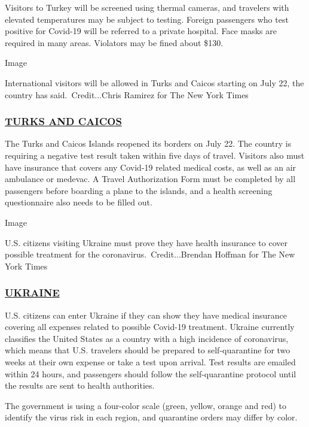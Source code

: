 Visitors to Turkey will be screened using thermal cameras, and travelers
with elevated temperatures may be subject to testing. Foreign passengers
who test positive for Covid-19 will be referred to a private hospital.
Face masks are required in many areas. Violators may be fined about
\$130.

Image

International visitors will be allowed in Turks and Caicos starting on
July 22, the country has said.~Credit...Chris Ramirez for The New York
Times

\hypertarget{turks-and-caicos}{%
\subsubsection{\texorpdfstring{\href{https://turksandcaicostourism.com/}{TURKS
AND CAICOS}}{TURKS AND CAICOS}}\label{turks-and-caicos}}

The Turks and Caicos Islands reopened its borders on July 22. The
country is requiring a negative test result taken within five days of
travel. Visitors also must have insurance that covers any Covid-19
related medical costs, as well as an air ambulance or medevac. A Travel
Authorization Form must be completed by all passengers before boarding a
plane to the islands, and a health screening questionnaire also needs to
be filled out.

Image

U.S. citizens visiting Ukraine must prove they have health insurance to
cover possible treatment for the coronavirus.~Credit...Brendan Hoffman
for The New York Times

\hypertarget{ukraine}{%
\subsubsection{\texorpdfstring{\href{https://ua.usembassy.gov/covid-19-information/}{UKRAINE}}{UKRAINE}}\label{ukraine}}

U.S. citizens can enter Ukraine if they can show they have medical
insurance covering all expenses related to possible Covid-19 treatment.
Ukraine currently classifies the United States as a country with a high
incidence of coronavirus, which means that U.S. travelers should be
prepared to self-quarantine for two weeks at their own expense or take a
test upon arrival. Test results are emailed within 24 hours, and
passengers should follow the self-quarantine protocol until the results
are sent to health authorities.

The government is using a four-color scale (green, yellow, orange and
red) to identify the virus risk in each region, and quarantine orders
may differ by color.


